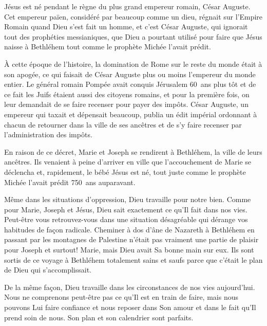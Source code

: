 

Jésus est né pendant le règne du plus grand empereur romain, César Auguste. Cet empereur païen, considéré par beaucoup comme un dieu, régnait sur l'Empire Romain quand Dieu s'est fait un homme, et c'est César Auguste, qui ignorait tout des prophéties messianiques, que Dieu a pourtant utilisé pour faire que Jésus naisse à Bethléhem tout comme le prophète Michée l'avait prédit.

À cette époque de l'histoire, la domination de Rome sur le reste du monde était à son apogée, ce qui faisait de César Auguste plus ou moins l'empereur du monde entier. Le général romain Pompée avait conquis Jérusalem 60~ans plus tôt et de ce fait les Juifs étaient aussi des citoyens romains, et pour la première fois, on leur demandait de se faire recenser pour payer des impôts. César Auguste, un empereur qui taxait et dépensait beaucoup, publia un édit impérial ordonnant à chacun de retourner dans la ville de ses ancêtres et de s'y faire recenser par l'administration des impôts.

En raison de ce décret, Marie et Joseph se rendirent à Bethléhem, la ville de leurs ancêtres. Ils venaient à peine d'arriver en ville que l'accouchement de Marie se déclencha et, rapidement, le bébé Jésus est né, tout juste comme le prophète Michée l'avait prédit 750~ans auparavant.

Même dans les situations d'oppression, Dieu travaille pour notre bien. Comme pour Marie, Joseph et Jésus, Dieu sait exactement ce qu'Il fait dans nos vies. Peut-être vous retrouvez-vous dans une situation désagréable qui dérange vos habitudes de façon radicale. Cheminer à dos d'âne de Nazareth à Bethléhem en passant par les montagnes de Palestine n'était pas vraiment une partie de plaisir pour Joseph et \ocadr surtout! \fcadr{} Marie, mais Dieu avait Sa bonne main sur eux. Ils sont sortis de ce voyage à Bethléhem totalement sains et saufs parce que c'était le plan de Dieu qui s'accomplissait.

De la même façon, Dieu travaille dans les circonstances de nos vies aujourd'hui. Nous ne comprenons peut-être pas ce qu'Il est en train de faire, mais nous pouvons Lui faire confiance et nous reposer dans Son amour et dans le fait qu'Il prend soin de nous. Son plan et son calendrier sont parfaits.

\begin{dvquotes}
\end{dvquotes}

